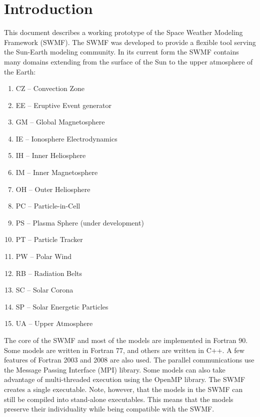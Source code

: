 


\chapter{Introduction}

This document describes a working prototype of the 
Space Weather Modeling Framework (SWMF).
The SWMF was developed to provide a flexible tool serving the Sun-Earth
modeling community.  In its current form the SWMF contains many 
domains extending from the surface of the Sun to the upper atmosphere of the 
Earth: 
\begin{enumerate}
\item CZ -- Convection Zone
\item EE -- Eruptive Event generator
\item GM -- Global Magnetosphere 
\item IE -- Ionosphere Electrodynamics
\item IH -- Inner Heliosphere
\item IM -- Inner Magnetosphere
\item OH -- Outer Heliosphere
\item PC -- Particle-in-Cell
\item PS -- Plasma Sphere (under development)
\item PT -- Particle Tracker
\item PW -- Polar Wind
\item RB -- Radiation Belts
\item SC -- Solar Corona
\item SP -- Solar Energetic Particles 
\item UA -- Upper Atmosphere
\end{enumerate}
The core of the SWMF and most of the models are implemented in Fortran 90.
Some models are written in Fortran 77, and others are written in C++.
A few features of Fortran 2003 and 2008 are also used.
The parallel communications use the Message Passing Interface (MPI) library. 
Some models can also take advantage of multi-threaded execution using the 
OpenMP library. The SWMF creates a single executable. Note, however, that the
models in the SWMF can still be compiled into stand-alone executables.
This means that the models preserve their individuality while being
compatible with the SWMF.

